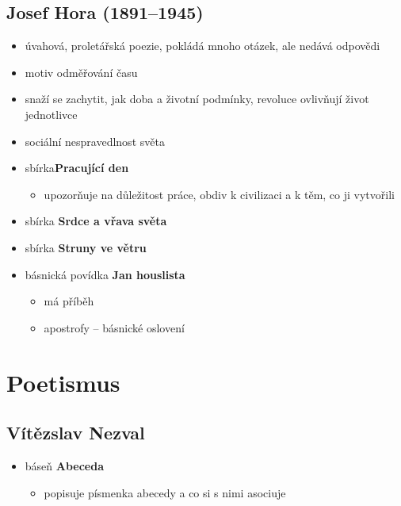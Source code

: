 \subsection{Josef Hora (1891--1945)}
\begin{itemize}
\item úvahová, proletářská poezie, pokládá mnoho otázek, ale nedává odpovědi
\item motiv odměřování času
\item snaží se zachytit, jak doba a životní podmínky, revoluce ovlivňují život jednotlivce
\item sociální nespravedlnost světa
\item sbírka\textbf{Pracující den}
	\begin{itemize}
	\item upozorňuje na důležitost práce, obdiv k civilizaci a k těm, co ji vytvořili
	\end{itemize}
\item sbírka \textbf{Srdce a vřava světa}
\item sbírka \textbf{Struny ve větru}
\item básnická povídka \textbf{Jan houslista}
	\begin{itemize}
	\item má příběh
	\item apostrofy -- básnické oslovení
	\end{itemize}
\end{itemize}

\section{Poetismus}
\subsection{Vítězslav Nezval}
\begin{itemize}
\item báseň \textbf{Abeceda}
	\begin{itemize}
	\item popisuje písmenka abecedy a co si s nimi asociuje
	\end{itemize}
\end{itemize}



